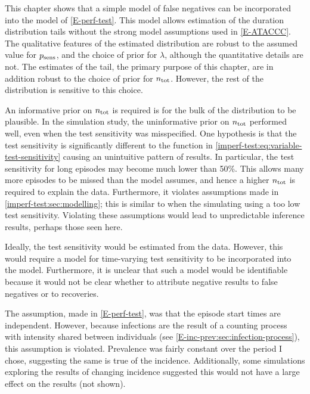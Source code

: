 \documentclass[thesis.tex]{subfiles}
\begin{document}
This chapter shows that a simple model of false negatives can be incorporated into the model of \cref{E-perf-test}.
This model allows estimation of the duration distribution tails without the strong model assumptions used in \cref{E-ATACCC}.
The qualitative features of the estimated distribution are robust to the assumed value for $p_\text{sens}$, and the choice of prior for $\lambda$, although the quantitative details are not.
The estimates of the tail, the primary purpose of this chapter, are in addition robust to the choice of prior for $n_\text{tot}$.
However, the rest of the distribution is sensitive to this choice.

An informative prior on $n_\text{tot}$ is required is for the bulk of the distribution to be plausible.
In the simulation study, the uninformative prior on $n_\text{tot}$ performed well, even when the test sensitivity was misspecified.
One hypothesis is that the test sensitivity is significantly different to the function in \cref{imperf-test:eq:variable-test-sensitivity} causing an unintuitive pattern of results.
In particular, the test sensitivity for long episodes may become much lower than 50\%.
This allows many more episodes to be missed than the model assumes, and hence a higher $n_\text{tot}$ is required to explain the data.
Furthermore, it violates assumptions made in \cref{imperf-test:sec:modelling}; this is similar to when the simulating using a too low test sensitivity.
Violating these assumptions would lead to unpredictable inference results, perhaps those seen here.

Ideally, the test sensitivity would be estimated from the data.
However, this would require a model for time-varying test sensitivity to be incorporated into the model.
Furthermore, it is unclear that such a model would be identifiable because it would not be clear whether to attribute negative results to false negatives or to recoveries.

The assumption, made in \cref{E-perf-test}, was that the episode start times are independent.
However, because infections are the result of a counting process with intensity shared between individuals (see \cref{E-inc-prev:sec:infection-process}), this assumption is violated.
Prevalence was fairly constant over the period I chose, suggesting the same is true of the incidence.
Additionally, some simulations exploring the results of changing incidence suggested this would not have a large effect on the results (not shown).

\end{document}
